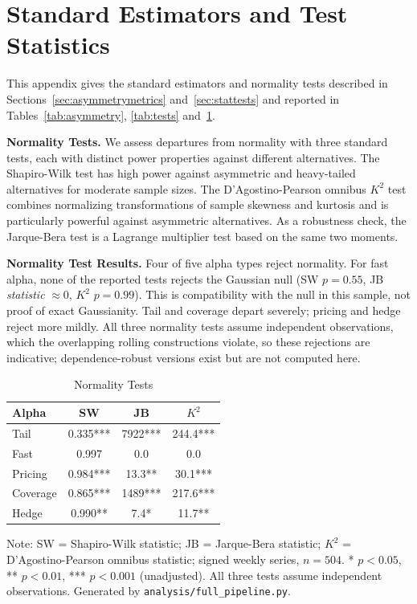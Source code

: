 \documentclass[11pt]{article}
\begin{document}
\clearpage
\section{Standard Estimators and Test Statistics}
\label{appendix:tests}
\setcounter{equation}{0}
\renewcommand{\theequation}{\thesection.\arabic{equation}}
\renewcommand{\theHequation}{\thesection.\arabic{equation}}

This appendix gives the standard estimators and normality tests described in Sections~\ref{sec:asymmetrymetrics} and~\ref{sec:stattests} and reported in Tables~\ref{tab:asymmetry}, \ref{tab:tests} and~\ref{tab:normality}.

\textbf{Normality Tests.} We assess departures from normality with three standard tests, each with distinct power properties against different alternatives. The Shapiro-Wilk test \citep{shapiro1965analysis} has high power against asymmetric and heavy-tailed alternatives for moderate sample sizes. The D'Agostino-Pearson omnibus $K^2$ test \citep{dagostino1990suggestion} combines normalizing transformations of sample skewness and kurtosis and is particularly powerful against asymmetric alternatives. As a robustness check, the Jarque-Bera test \citep{jarque1980efficient} is a Lagrange multiplier test based on the same two moments.

\textbf{Normality Test Results.} Four of five alpha types reject normality. For fast alpha, none of the reported tests rejects the Gaussian null (SW $p = 0.55$, JB \emph{statistic} $\approx 0$, $K^2$ $p = 0.99$). This is compatibility with the null in this sample, not proof of exact Gaussianity. Tail and coverage depart severely; pricing and hedge reject more mildly. All three normality tests assume independent observations, which the overlapping rolling constructions violate, so these rejections are indicative; dependence-robust versions exist \citep{bai2005tests} but are not computed here.

\begin{table}[H]
\centering
\caption{Normality Tests}
\label{tab:normality}
\small
\begin{tabular}{@{}lccc@{}}
\toprule
Alpha & SW & JB & $K^2$ \\
\midrule
Tail & 0.335*** & 7922*** & 244.4*** \\
Fast & 0.997 & 0.0 & 0.0 \\
Pricing & 0.984*** & 13.3** & 30.1*** \\
Coverage & 0.865*** & 1489*** & 217.6*** \\
Hedge & 0.990** & 7.4* & 11.7** \\
\bottomrule
\end{tabular}
\par\vspace{0.3em}
\parbox{\linewidth}{\footnotesize Note: SW = Shapiro-Wilk statistic; JB = Jarque-Bera statistic; $K^2$ = D'Agostino-Pearson omnibus statistic; signed weekly series, $n = 504$. * $p < 0.05$, ** $p < 0.01$, *** $p < 0.001$ (unadjusted). All three tests assume independent observations. Generated by \texttt{analysis/full\_pipeline.py}.}
\end{table}
\end{document}

